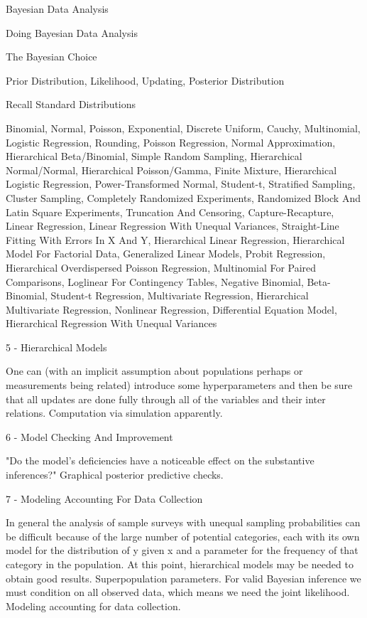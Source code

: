 Bayesian Data Analysis

Doing Bayesian Data Analysis

The Bayesian Choice

Prior Distribution, Likelihood, Updating, Posterior Distribution

Recall Standard Distributions

Binomial, Normal, Poisson, Exponential, Discrete Uniform, Cauchy, Multinomial, Logistic Regression, Rounding, Poisson Regression, Normal Approximation, Hierarchical Beta/Binomial, Simple Random Sampling, Hierarchical Normal/Normal, Hierarchical Poisson/Gamma, Finite Mixture, Hierarchical Logistic Regression, Power-Transformed Normal, Student-t, Stratified Sampling, Cluster Sampling, Completely Randomized Experiments, Randomized Block And Latin Square Experiments, Truncation And Censoring, Capture-Recapture, Linear Regression, Linear Regression With Unequal Variances, Straight-Line Fitting With Errors In X And Y, Hierarchical Linear Regression, Hierarchical Model For Factorial Data, Generalized Linear Models, Probit Regression, Hierarchical Overdispersed Poisson Regression, Multinomial For Paired Comparisons, Loglinear For Contingency Tables, Negative Binomial, Beta-Binomial, Student-t Regression, Multivariate Regression, Hierarchical Multivariate Regression, Nonlinear Regression, Differential Equation Model, Hierarchical Regression With Unequal Variances

5 - Hierarchical Models

One can (with an implicit assumption about populations perhaps or measurements being related) introduce some hyperparameters and then be sure that all updates are done fully through all of the variables and their inter relations. Computation via simulation apparently.

6 - Model Checking And Improvement

"Do the model's deficiencies have a noticeable effect on the substantive inferences?" Graphical posterior predictive checks.

7 - Modeling Accounting For Data Collection

In general the analysis of sample surveys with unequal sampling probabilities can be difficult because of the large number of potential categories, each with its own model for the distribution of y given x and a parameter for the frequency of that category in the population. At this point, hierarchical models may be needed to obtain good results. Superpopulation parameters. For valid Bayesian inference we must condition on all observed data, which means we need the joint likelihood. Modeling accounting for data collection.

